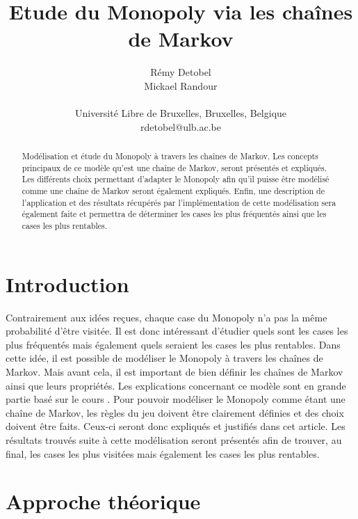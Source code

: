 \documentclass[letterpaper]{article}
\title{Etude du Monopoly via les chaînes de Markov}
\author{Rémy Detobel\\
Mickael Randour\\
\mbox{}\\
Université Libre de Bruxelles, Bruxelles, Belgique \\
rdetobel@ulb.ac.be}
\begin{document}
\maketitle

\begin{abstract}
  Modélisation et étude du Monopoly à travers les chaînes de Markov.
  Les concepts principaux de ce modèle qu'est une chaîne de Markov,
  seront présentés et expliqués.  Les différents choix permettant 
  d'adapter le Monopoly afin qu'il puisse être modélisé comme une chaîne 
  de Markov seront également expliqués.  Enfin, une description de 
  l'application et des résultats récupérés par l'implémentation de cette 
  modélisation sera également faite et permettra de déterminer les cases 
  les plus fréquentés ainsi que les cases les plus rentables.
\end{abstract}

\section{Introduction}
  Contrairement aux idées reçues, chaque case du Monopoly n'a pas la même
  probabilité d'être visitée.  Il est donc intéressant d'étudier quels sont
  les cases les plus fréquentés mais également quels seraient les cases
  les plus rentables.  Dans cette idée, il est possible de modéliser
  le Monopoly à travers les chaînes de Markov.  Mais avant cela, il est 
  important de bien définir les chaînes de Markov ainsi que leurs propriétés.
  Les explications concernant ce modèle sont en grande partie basé 
  sur le cours \citep{COURS}.
  Pour pouvoir modéliser le Monopoly comme étant une chaîne de Markov, 
  les règles du jeu doivent être clairement définies et des choix doivent
  être faits.  Ceux-ci seront donc expliqués et justifiés dans cet article.
  Les résultats trouvés suite à cette modélisation seront présentés afin
  de trouver, au final, les cases les plus visitées mais également les cases
  les plus rentables.
  
  
\section{Approche théorique}
  
\end{document}
